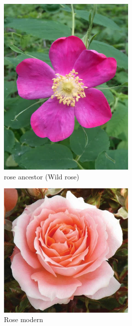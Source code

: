 \documentclass[11pt,ignorenonframetext,aspectratio=169]{beamer}
\begin{document}
\begin{frame}{}
\protect\hypertarget{section-6}{}
\begin{figure}
\includegraphics[width=0.6\textwidth, keepaspectratio,height=0.45\textheight]{./images/rose_prickly_or_common} \caption{rose ancestor (Wild rose)}\label{fig:rose-wild}
\end{figure}

\begin{figure}
\includegraphics[width=0.6\textwidth, keepaspectratio,height=0.45\textheight]{./images/rose-modern} \caption{Rose modern}\label{fig:rose-modern}
\end{figure}
\end{frame}
\end{document}
